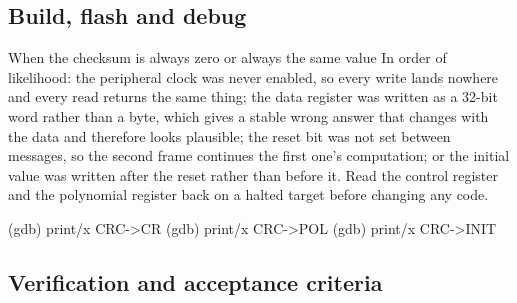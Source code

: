 \subsection*{Build, flash and debug}



\begin{note}{When the checksum is always zero or always the same value}
In order of likelihood: the peripheral clock was never enabled, so every write
lands nowhere and every read returns the same thing; the data register was
written as a 32-bit word rather than a byte, which gives a stable wrong answer
that changes with the data and therefore looks plausible; the reset bit was not
set between messages, so the second frame continues the first one's computation;
or the initial value was written after the reset rather than before it. Read the
control register and the polynomial register back on a halted target before
changing any code.
\end{note}

\begin{shellcode}
(gdb) print/x CRC->CR
(gdb) print/x CRC->POL
(gdb) print/x CRC->INIT
\end{shellcode}

\subsection*{Verification and acceptance criteria}

